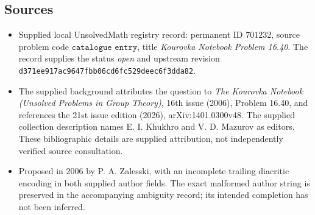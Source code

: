 \documentclass[11pt]{article}
\begin{document}
\subsection{Sources}
\begin{itemize}
\item Supplied local UnsolvedMath registry record: permanent ID \(701232\), source problem code \(\texttt{catalogue entry}\), title \emph{Kourovka Notebook Problem 16.40}. The record supplies the status \emph{open} and upstream revision \texttt{d371ee917ac9647fbb06cd6fc529deec6f3dda82}.
\item The supplied background attributes the question to \emph{The Kourovka Notebook (Unsolved Problems in Group Theory)}, 16th issue (2006), Problem 16.40, and references the 21st issue edition (2026), arXiv:1401.0300v48. The supplied collection description names E. I. Khukhro and V. D. Mazurov as editors. These bibliographic details are supplied attribution, not independently verified source consultation.
\item Proposed in 2006 by P. A. Zalesski, with an incomplete trailing diacritic encoding in both supplied author fields. The exact malformed author string is preserved in the accompanying ambiguity record; its intended completion has not been inferred.
\end{itemize}
\end{document}
